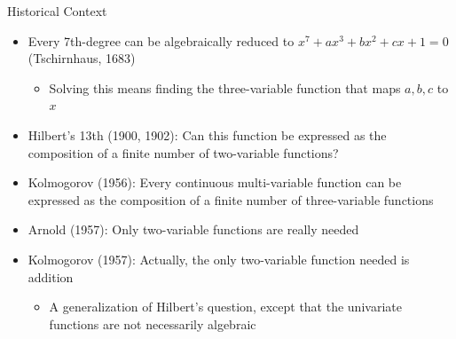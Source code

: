 

\begin{frame}{Historical Context}

\begin{itemize}
\item Every 7th-degree can be algebraically reduced to
  $x^{7}+ax^{3}+bx^{2}+cx+1=0$ \textcolor{citations}{(Tschirnhaus, 1683)}
  \begin{itemize}
  \item Solving this means finding the three-variable function that maps
    $a,b,c$ to $x$
  \end{itemize}
\item \textcolor{citations}{Hilbert's 13th (1900, 1902)}:
  Can this function be expressed as the composition of a finite number
  of two-variable functions?
\item \textcolor{citations}{Kolmogorov (1956)}: Every continuous multi-variable function
  can be expressed as the composition of a finite number of
  three-variable functions
\item \textcolor{citations}{Arnold (1957)}: Only two-variable functions are really needed
\item \textcolor{citations}{Kolmogorov (1957)}: Actually, the only two-variable function
  needed is addition
  \begin{itemize}
  \item A generalization of Hilbert's question,
    except that the univariate functions are not necessarily algebraic
  \end{itemize}
\end{itemize}

\end{frame}



